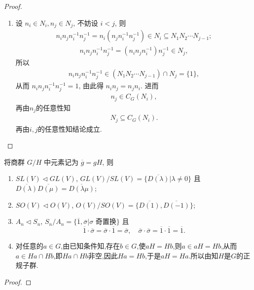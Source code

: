 \documentclass[../../main.tex]{subfiles}%
\begin{document}
\begin{proof}
\begin{enumerate}[(1)]
\item 设 $n_i \in N_i, n_j \in N_j$, 不妨设 $i < j$, 则
\begin{align*}
n_i n_j n_i^{-1} n_j^{-1} = n_i (n_j n_i^{-1} n_j^{-1}) \in N_i \subseteq N_1 N_2 \cdots N_{j-1};
\end{align*}
\begin{align*}
n_i n_j n_i^{-1} n_j^{-1} = (n_i n_j n_i^{-1}) n_j^{-1} \in N_j,
\end{align*}
所以
\begin{align*}
n_i n_j n_i^{-1} n_j^{-1} \in (N_1 N_2 \cdots N_{j-1}) \cap N_j = \{1\},
\end{align*}
从而 $n_i n_j n_i^{-1} n_j^{-1} = 1$, 由此得 $n_i n_j = n_j n_i$.
进而
\begin{align*}
n_j\in C_G(N_i),
\end{align*}
再由$n_j$的任意性知
\begin{align*}
N_j\subseteq C_G(N_i).
\end{align*}
再由$i,j$的任意性知结论成立.
\end{enumerate}

\end{proof}

\begin{example}
将商群 \( G/H \) 中元素记为 \( \overline{g} = gH \), 则
\begin{enumerate}[(1)]
\item \( SL(V) \lhd  GL(V) \), \( GL(V)/SL(V) = \{\overline{D(\lambda)}|\lambda \neq 0\} \) 且 \( \overline{D(\lambda)}\overline{D(\mu)} = \overline{D(\lambda\mu)} \);

\item \( SO(V) \lhd  O(V) \), \( O(V)/SO(V) = \{\overline{D(1)}, \overline{D(-1)}\} \);

\item \( A_n \lhd  S_n \), \( S_n/A_n = \{\overline{1}, \overline{\sigma}|\sigma \text{ 奇置换} \} \) 且
\[
\overline{1} \cdot \overline{\sigma} = \overline{\sigma} \cdot \overline{1} = \overline{\sigma}, \quad \overline{\sigma} \cdot \overline{\sigma} = \overline{1} \cdot \overline{1} = \overline{1}.
\]

\item 对任意的$a\in G$,由已知条件知,存在$b\in G$,使$aH = Hb$,则$a\in aH = Hb$,从而$a\in Ha\cap Hb$,即$Ha\cap Hb$非空,因此$Ha = Hb$,于是$aH = Ha$.所以由知$H$是$G$的正规子群.
\end{enumerate}
\end{example}
\begin{proof}



\end{proof}
\end{document}
